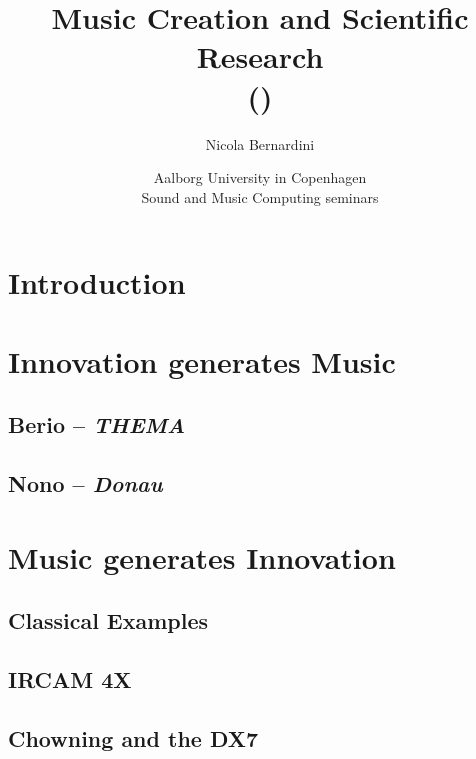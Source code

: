 \documentclass[\printmode,compress]{beamer}
\title[Music Creation and Scientific Research]
{%
    Music Creation and Scientific Research\\
	{\tiny (\rcstag)}
}
\author{%
	Nicola Bernardini\\
    \href{mailto:\cpholderemail}{\cpholderemail}
}
\institute[SMERM]%
{%
	\href{http://www.conservatoriosantacecilia.it}
		 {Conservatorio di Musica ``S.Cecilia'' -- Roma}
}
\date[Copenhagen, 20/11/2015]{Aalborg University in Copenhagen\\Sound and Music Computing seminars}
\begin{document}
  
\begin{frame}
	\titlepage
\end{frame}



\section{Introduction}



\section[Innovation $\Rightarrow$ Music]{Innovation generates Music}

\subsection{Berio -- {\it THEMA}}



\subsection{Nono -- {\it Donau}}



\section[Music $\Rightarrow$ Innovation]{Music generates Innovation}

\subsection[Classics]{Classical Examples}



\subsection[4X]{IRCAM 4X}



\subsection[DX7]{Chowning and the DX7}


\end{document}
